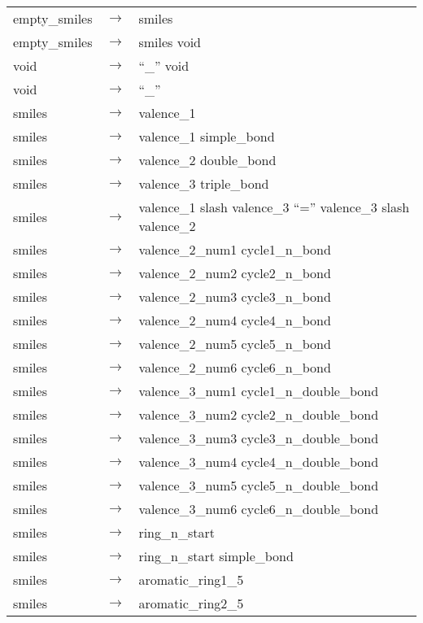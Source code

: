 \documentclass[../Document.tex]{subfiles}
\begin{document}
\footnotesize
\begin{longtable}{m{} p{} p{}}
    empty\_smiles & $\rightarrow$ & smiles \\
    empty\_smiles & $\rightarrow$ & smiles void \\
    void & $\rightarrow$ & ``\_'' void \\
    void & $\rightarrow$ & ``\_'' \\
    smiles & $\rightarrow$ & valence\_1 \\
    smiles & $\rightarrow$ & valence\_1 simple\_bond \\
    smiles & $\rightarrow$ & valence\_2 double\_bond \\
    smiles & $\rightarrow$ & valence\_3 triple\_bond \\
    smiles & $\rightarrow$ & valence\_1 slash valence\_3 ``='' valence\_3 slash valence\_2 \\
    smiles & $\rightarrow$ & valence\_2\_num1 cycle1\_n\_bond \\
    smiles & $\rightarrow$ & valence\_2\_num2 cycle2\_n\_bond \\
    smiles & $\rightarrow$ & valence\_2\_num3 cycle3\_n\_bond \\
    smiles & $\rightarrow$ & valence\_2\_num4 cycle4\_n\_bond \\
    smiles & $\rightarrow$ & valence\_2\_num5 cycle5\_n\_bond \\
    smiles & $\rightarrow$ & valence\_2\_num6 cycle6\_n\_bond \\
    smiles & $\rightarrow$ & valence\_3\_num1 cycle1\_n\_double\_bond \\
    smiles & $\rightarrow$ & valence\_3\_num2 cycle2\_n\_double\_bond \\
    smiles & $\rightarrow$ & valence\_3\_num3 cycle3\_n\_double\_bond \\
    smiles & $\rightarrow$ & valence\_3\_num4 cycle4\_n\_double\_bond \\
    smiles & $\rightarrow$ & valence\_3\_num5 cycle5\_n\_double\_bond \\
    smiles & $\rightarrow$ & valence\_3\_num6 cycle6\_n\_double\_bond \\
    smiles & $\rightarrow$ & ring\_n\_start \\
    smiles & $\rightarrow$ & ring\_n\_start simple\_bond \\
    smiles & $\rightarrow$ & aromatic\_ring1\_5 \\
    smiles & $\rightarrow$ & aromatic\_ring2\_5 \\

\end{longtable}
\end{document}
